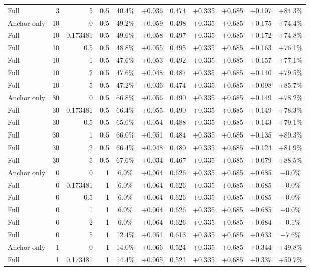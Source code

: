 \begin{table}[htbp]
\begin{tabular}{lrrrccccccc}
Full & 3 & 5 & 0.5 & 40.4\% & +0.036 & 0.474 & +0.335 & +0.685 & +0.107 & +84.3\% \\
Anchor only & 10 & 0 & 0.5 & 49.2\% & +0.059 & 0.498 & +0.335 & +0.685 & +0.175 & +74.4\% \\
Full & 10 & 0.173481 & 0.5 & 49.6\% & +0.058 & 0.497 & +0.335 & +0.685 & +0.172 & +74.8\% \\
Full & 10 & 0.5 & 0.5 & 48.8\% & +0.055 & 0.495 & +0.335 & +0.685 & +0.163 & +76.1\% \\
Full & 10 & 1 & 0.5 & 47.6\% & +0.053 & 0.492 & +0.335 & +0.685 & +0.157 & +77.1\% \\
Full & 10 & 2 & 0.5 & 47.6\% & +0.048 & 0.487 & +0.335 & +0.685 & +0.140 & +79.5\% \\
Full & 10 & 5 & 0.5 & 47.2\% & +0.036 & 0.474 & +0.335 & +0.685 & +0.098 & +85.7\% \\
Anchor only & 30 & 0 & 0.5 & 66.8\% & +0.056 & 0.490 & +0.335 & +0.685 & +0.149 & +78.2\% \\
Full & 30 & 0.173481 & 0.5 & 66.4\% & +0.055 & 0.490 & +0.335 & +0.685 & +0.149 & +78.3\% \\
Full & 30 & 0.5 & 0.5 & 65.6\% & +0.054 & 0.488 & +0.335 & +0.685 & +0.143 & +79.1\% \\
Full & 30 & 1 & 0.5 & 66.0\% & +0.051 & 0.484 & +0.335 & +0.685 & +0.135 & +80.3\% \\
Full & 30 & 2 & 0.5 & 66.4\% & +0.048 & 0.480 & +0.335 & +0.685 & +0.124 & +81.9\% \\
Full & 30 & 5 & 0.5 & 67.6\% & +0.034 & 0.467 & +0.335 & +0.685 & +0.079 & +88.5\% \\
Anchor only & 0 & 0 & 1 & 6.0\% & +0.064 & 0.626 & +0.335 & +0.685 & +0.685 & +0.0\% \\
Full & 0 & 0.173481 & 1 & 6.0\% & +0.064 & 0.626 & +0.335 & +0.685 & +0.685 & +0.0\% \\
Full & 0 & 0.5 & 1 & 6.0\% & +0.064 & 0.626 & +0.335 & +0.685 & +0.685 & +0.0\% \\
Full & 0 & 1 & 1 & 6.0\% & +0.064 & 0.626 & +0.335 & +0.685 & +0.685 & +0.0\% \\
Full & 0 & 2 & 1 & 6.0\% & +0.064 & 0.626 & +0.335 & +0.685 & +0.684 & +0.1\% \\
Full & 0 & 5 & 1 & 12.4\% & +0.051 & 0.613 & +0.335 & +0.685 & +0.633 & +7.6\% \\
Anchor only & 1 & 0 & 1 & 14.0\% & +0.066 & 0.524 & +0.335 & +0.685 & +0.344 & +49.8\% \\
Full & 1 & 0.173481 & 1 & 14.4\% & +0.065 & 0.521 & +0.335 & +0.685 & +0.337 & +50.7\% \\

\end{tabular}
\end{table}
